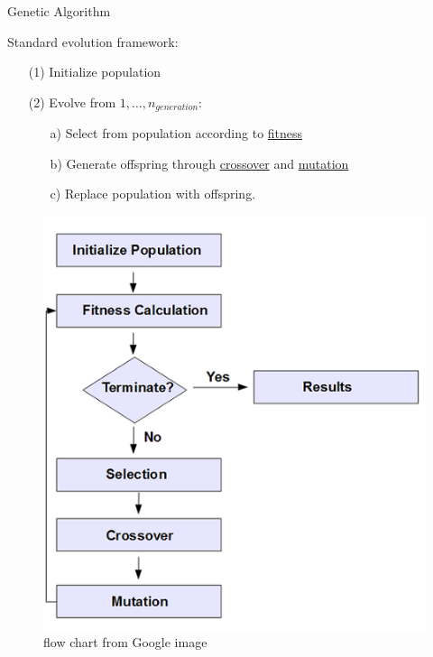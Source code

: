 \documentclass{beamer}
\begin{document}
\begin{frame}{Genetic Algorithm}
\begin{block}{}
  Standard evolution framework:
\begin{itemize}
  \item[(1)] Initialize population
  \item[(2)] Evolve from $1, \ldots, n_{generation}$:
  \begin{itemize} 
  \item[a)] Select from population according to \underline{fitness}
  \item[b)] Generate offspring through \underline{crossover} and \underline{mutation}
  \item[c)] Replace population with offspring. 
  \end{itemize}
\end{itemize}

\end{block}


\end{frame}
\begin{frame}
\begin{figure}[htbp]
  \includegraphics[width = .6\textwidth]{Genetic}
  \caption{flow chart from Google image}
\end{figure}
\end{frame}
\end{document}
